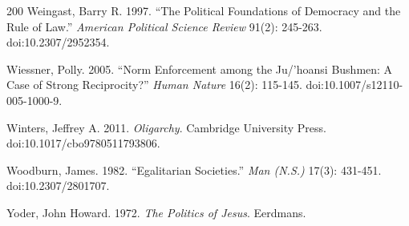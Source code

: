 \documentclass[11pt,letterpaper]{article}
\theoremstyle{definition}
\theoremstyle{remark}
\begin{document}
\begin{thebibliography}{200}
Weingast, Barry R. 1997. ``The Political Foundations of Democracy and the Rule of Law.'' \emph{American Political Science Review} 91(2): 245-263. doi:10.2307/2952354.

Wiessner, Polly. 2005. ``Norm Enforcement among the Ju/'hoansi Bushmen: A Case of Strong Reciprocity?'' \emph{Human Nature} 16(2): 115-145. doi:10.1007/s12110-005-1000-9.

Winters, Jeffrey A. 2011. \emph{Oligarchy}. Cambridge University Press. doi:10.1017/cbo9780511793806.

Woodburn, James. 1982. ``Egalitarian Societies.'' \emph{Man (N.S.)} 17(3): 431-451. doi:10.2307/2801707.

Yoder, John Howard. 1972. \emph{The Politics of Jesus}. Eerdmans.

\end{thebibliography}
\end{document}
